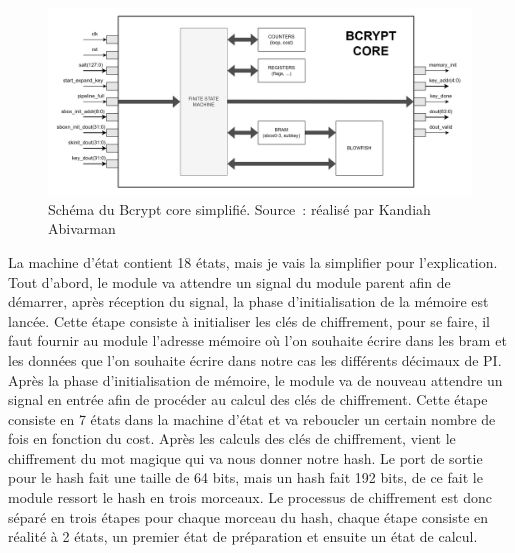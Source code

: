 \begin{figure}[tbph!]
	\centering
	\includegraphics[width=0.9\linewidth]{bcrypt_core_simplified}
	\caption[Schéma Bcrypt core simplifié]{Schéma du Bcrypt core simplifié. Source : réalisé par Kandiah Abivarman}
	\label{fig:bcrypt_core_simplified}
\end{figure}

La machine d'état contient 18 états, mais je vais la simplifier pour l'explication. 
Tout d'abord, le module va attendre un signal du module parent afin de démarrer, après réception du signal, la phase d'initialisation de la mémoire est lancée. 
Cette étape consiste à initialiser les clés de chiffrement, pour se faire, il faut fournir au module l'adresse mémoire où l'on souhaite écrire dans les \gls{bram} et les données que l'on souhaite écrire dans notre cas les différents décimaux de PI. 
Après la phase d'initialisation de mémoire, le module va de nouveau attendre un signal en entrée afin de procéder au calcul des clés de chiffrement. 
Cette étape consiste en 7 états dans la machine d'état et va reboucler un certain nombre de fois en fonction du cost. Après les calculs des clés de chiffrement, vient le chiffrement du mot magique qui va nous donner notre hash. 
Le port de sortie pour le hash fait une taille de 64 bits, mais un hash fait 192 bits, de ce fait le module ressort le hash en trois morceaux. 
Le processus de chiffrement est donc séparé en trois étapes pour chaque morceau du hash, chaque étape consiste en réalité à 2 états, un premier état de préparation et ensuite un état de calcul.

\newpage

